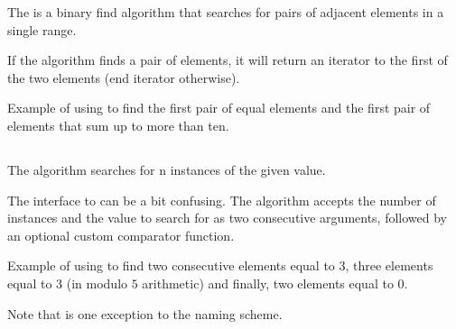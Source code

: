 The  is a binary find algorithm that searches for pairs of adjacent elements in a single range.


If the algorithm finds a pair of elements, it will return an iterator to the first of the two elements (end iterator otherwise).

\begin{codebox}[]{\href{https://compiler-explorer.com/z/Paao79a68}{\ExternalLink}}
\footnotesize Example of using  to find the first pair of equal elements and the first pair of elements that sum up to more than ten.
\tcblower
{}
\end{codebox}

\subsection{\texorpdfstring{}{\texttt{std::search\_n}}}

The  algorithm searches for n instances of the given value.


The interface to  can be a bit confusing. The algorithm accepts the number of instances and the value to search for as two consecutive arguments, followed by an optional custom comparator function.

\begin{codebox}[breakable]{\href{https://compiler-explorer.com/z/q737jor9n}{\ExternalLink}}
\footnotesize Example of using  to find two consecutive elements equal to $3$, three elements equal to $3$ (in modulo $5$ arithmetic) and finally, two elements equal to $0$.
\tcblower
{}
\end{codebox}

Note that  is one exception to the  naming scheme.

\subsection{\texorpdfstring{}{\texttt{std::find\_first\_of}}}

